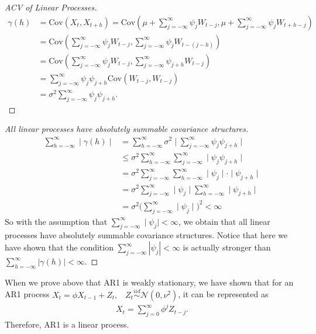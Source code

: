 \documentclass[]{book}
\theoremstyle{definition}
\theoremstyle{definition}
\theoremstyle{definition}
\theoremstyle{remark}
\let\BeginKnitrBlock\begin \let\EndKnitrBlock\end
\begin{document}
\BeginKnitrBlock{proof}[ACV of Linear Processes]
{}\begin{align*}
\gamma(h) &= \text{Cov}(X_t, X_{t+h}) = \text{Cov}(\mu+\sum_{j=-\infty}^{\infty} \psi_j W_{t-j}, \mu+\sum_{j=-\infty}^{\infty} \psi_j W_{t+h-j})\\
&= \text{Cov}(\sum_{j=-\infty}^{\infty} \psi_j W_{t-j}, \sum_{j=-\infty}^{\infty} \psi_j W_{t-(j-h)}) \\
&= \text{Cov}(\sum_{j=-\infty}^{\infty} \psi_j W_{t-j}, \sum_{j=-\infty}^{\infty} \psi_{j+h} W_{t-j}) \\
&= \sum_{j=-\infty}^{\infty} \psi_j \psi_{j+h} \text{Cov}(W_{t-j}, W_{t-j}) \\
&= \sigma^2\sum\limits_{j =  - \infty }^\infty  {{\psi _j}{\psi _{j+h}}}.
\end{align*}
\EndKnitrBlock{proof}

\BeginKnitrBlock{proof}[All linear processes have absolutely summable covariance structures]
{}\begin{align*}
\sum_{h=-\infty}^{\infty} \mid \gamma(h) \mid &= \sum_{h=-\infty}^{\infty} \sigma^2 \mid \sum_{j=-\infty}^{\infty} \psi_j \psi_{j+h} \mid \\
&\leq \sigma^2 \sum_{h=-\infty}^{\infty} \sum_{j=-\infty}^{\infty} \mid \psi_j \psi_{j+h} \mid \\
&= \sigma^2 \sum_{j=-\infty}^{\infty} \sum_{h=-\infty}^{\infty} \mid \psi_j \mid \cdot \mid \psi_{j+h} \mid \\
&= \sigma^2 \sum_{j=-\infty}^{\infty} \mid \psi_j \mid \sum_{h=-\infty}^{\infty} \mid \psi_{j+h} \mid \\
&= \sigma^2 \big( \sum_{j=-\infty}^{\infty} \mid \psi_j \mid \big)^2 < \infty
\end{align*} So with the assumption that
\(\sum_{j=-\infty}^{\infty} \mid \psi_j \mid < \infty\), we obtain that
all linear processes have absolutely summable covariance structures.
Notice that here we have shown that the condition
\(\sum\limits_{j = - \infty }^\infty {\left| {{\psi _j}} \right|} < \infty\)
is actually stronger than
\(\sum\limits_{h = - \infty }^\infty {\left| \gamma(h) \right|} < \infty\).
\EndKnitrBlock{proof}

\BeginKnitrBlock{example}[AR1 is a linear process]
\protect\hypertarget{exm:AR1isLP}{}{\label{exm:AR1isLP} {} }When we prove above that AR1 is weakly
stationary, we have shown that for an AR1 process
\(X_t = \phi X_{t-1} + Z_t, \;\;\; Z_t \overset{iid}{\sim} \mathcal{N}(0,\nu^2)\),
it can be represented as \begin{align*}
X_t = \sum\limits_{j = 0}^{\infty} {{\phi ^j}{Z_{t - j}}}.
\end{align*} Therefore, AR1 is a linear process.
\EndKnitrBlock{example}
\end{document}
